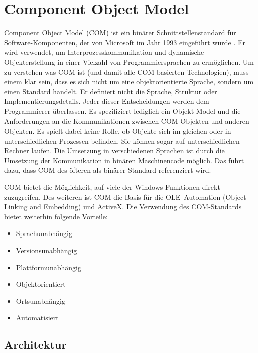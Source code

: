 \section{Component Object Model}
\label{ch:grundlagen:sec:ComponentObjectModel}

Component Object Model (COM) ist ein binärer Schnittstellenstandard für Software-Komponenten, der von Microsoft im Jahr 1993 eingeführt wurde \cite{SWB-088582566}. Er wird verwendet, um Interprozesskommunikation und dynamische Objekterstellung in einer Vielzahl von Programmiersprachen zu ermöglichen. Um zu verstehen was COM ist (und damit alle COM-basierten Technologien), muss einem klar sein, dass es sich nicht um eine objektorientierte Sprache, sondern um einen Standard handelt. Er definiert nicht die Sprache, Struktur oder Implementierungsdetails. Jeder dieser Entscheidungen werden dem Programmierer überlassen. Es spezifiziert lediglich ein Objekt Model und die Anforderungen an die Kommunikationen zwischen COM-Objekten und anderen Objekten. Es spielt dabei keine Rolle, ob Objekte sich im gleichen oder in unterschiedlichen Prozessen befinden. Sie können sogar auf unterschiedlichen Rechner laufen. Die Umsetzung in verschiedenen Sprachen ist durch die Umsetzung der Kommunikation in binären Maschinencode möglich. Das führt dazu, dass COM des öfteren als binärer Standard referenziert wird.

COM bietet die Möglichkeit, auf viele der Windows-Funktionen direkt zuzugreifen. Des weiteren ist COM die Basis für die OLE–Automation (Object Linking and Embedding) und ActiveX. Die Verwendung des COM-Standards bietet weiterhin folgende Vorteile:

\begin{itemize}
\item Sprachunabhängig
\item Versionsunabhängig
\item Plattformunabhängig
\item Objektorientiert
\item Ortsunabhängig
\item Automatisiert
\end{itemize} 

\subsection{Architektur}
\label{ch:grundlagen:sec:ComponentObjectModel:subsec:Architektur}

